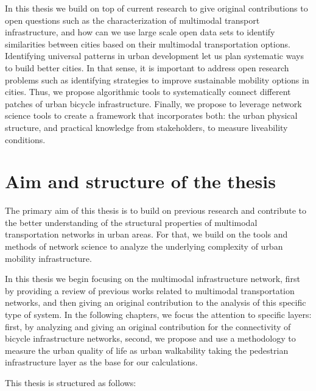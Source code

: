 In this thesis we build on top of current research to give original contributions to open questions such as the characterization of multimodal transport infrastructure, and how can we use large scale open data sets to identify similarities between cities based on their multimodal transportation options. Identifying universal patterns in urban development let us plan systematic ways to build better cities. In that sense, it is important to address open research problems such as identifying strategies to improve sustainable mobility options in cities. Thus, we propose algorithmic tools to systematically connect different patches of urban bicycle infrastructure. Finally, we propose to leverage network science tools to create a framework that incorporates both: the urban physical structure, and practical knowledge from stakeholders, to measure liveability conditions.

\section{Aim and structure of the thesis}

The primary aim of this thesis is to build on previous research and contribute to the better understanding of the structural properties of multimodal transportation networks in urban areas. For that, we build on the tools and methods of network science to analyze the underlying complexity of urban mobility infrastructure.

In this thesis we begin focusing on the multimodal infrastructure network, first by providing a review of previous works related to multimodal transportation networks, and then giving an original contribution to the analysis of this specific type of system. In the following chapters, we focus the attention to specific layers: first, by analyzing and giving an original contribution for the connectivity of bicycle infrastructure networks, second, we propose and use a methodology to measure the urban quality of life as urban walkability taking the pedestrian infrastructure layer as the base for our calculations.

This thesis is structured as follows:

